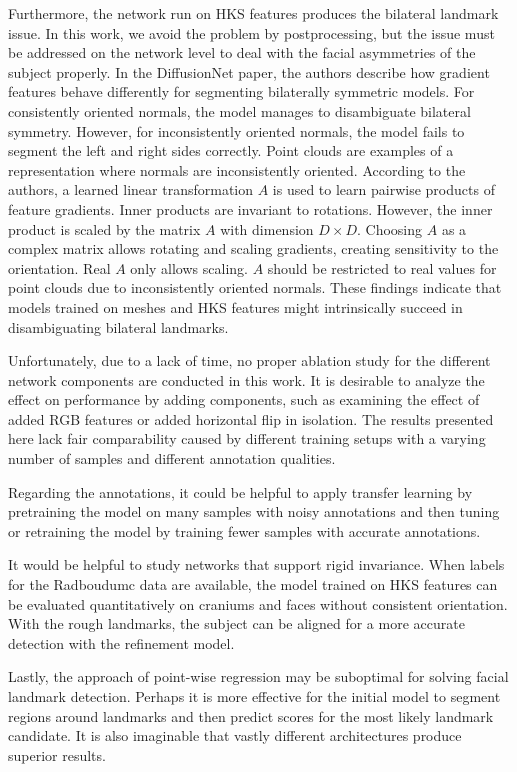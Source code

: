 \documentclass[class=article, crop=false]{standalone}
\begin{document}
Furthermore, the network run on HKS features produces the bilateral landmark issue. In this work, we avoid the problem by postprocessing, but the issue must be addressed on the network level to deal with the facial asymmetries of the subject properly. In the DiffusionNet paper, the authors describe how gradient features behave differently for segmenting bilaterally symmetric models. For consistently oriented normals, the model manages to disambiguate bilateral symmetry. However, for inconsistently oriented normals, the model fails to segment the left and right sides correctly. Point clouds are examples of a representation where normals are inconsistently oriented. According to the authors, a learned linear transformation $A$ is used to learn pairwise products of feature gradients. Inner products are invariant to rotations. However, the inner product is scaled by the matrix $A$ with dimension $D \times D$. Choosing $A$ as a complex matrix allows rotating and scaling gradients, creating sensitivity to the orientation. Real $A$ only allows scaling. $A$ should be restricted to real values for point clouds due to inconsistently oriented normals. These findings indicate that models trained on meshes and HKS features might intrinsically succeed in disambiguating bilateral landmarks.

Unfortunately, due to a lack of time, no proper ablation study for the different network components are conducted in this work. It is desirable to analyze the effect on performance by adding components, such as examining the effect of added RGB features or added horizontal flip in isolation. The results presented here lack fair comparability caused by different training setups with a varying number of samples and different annotation qualities.

Regarding the annotations, it could be helpful to apply transfer learning by pretraining the model on many samples with noisy annotations and then tuning or retraining the model by training fewer samples with accurate annotations.

It would be helpful to study networks that support rigid invariance. When labels for the Radboudumc data are available, the model trained on HKS features can be evaluated quantitatively on craniums and faces without consistent orientation. With the rough landmarks, the subject can be aligned for a more accurate detection with the refinement model.

Lastly, the approach of point-wise regression may be suboptimal for solving facial landmark detection. Perhaps it is more effective for the initial model to segment regions around landmarks and then predict scores for the most likely landmark candidate. It is also imaginable that vastly different architectures produce superior results.
\end{document}
